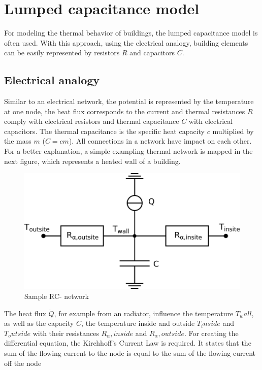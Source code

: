     
\section{Lumped capacitance model}
\label{section:modeling}
For modeling the thermal behavior of buildings, the lumped capacitance model is often used. With this approach, using the electrical analogy, building elements can be easily represented by resistors $R$ and capacitors $C$. \cite{Kramer.2012}

\subsection{Electrical analogy}
\label{electricalanalogy}

    Similar to an electrical network, the potential is represented by the temperature at one node, the heat flux corresponds to the current and thermal resistances $R$ comply with electrical resistors and thermal capacitance $C$ with electrical capacitors. The thermal capacitance is the specific heat capacity $c$ multiplied by the mass $m$ ($C=cm$). All connections in a network have impact on each other. For a better explanation, a simple exampling thermal network is mapped in the next figure, which represents a heated wall of a building.
    \begin{figure}[h]
    \centering
    \includegraphics{figure/beispiel Netzwerk.png}
    \caption{Sample RC- network}
    \label{fig:sampleRCnetwork}
    \end{figure}
    The heat flux $\dot{Q}$, for example from an radiator, influence the temperature $T_wall$, as well as the capacity $C$, the temperature inside and outside $T_inside$ and $T_outside$ with their resistances $R_\alpha,inside$ and $R_\alpha,outside$.
    For creating the differential equation, the Kirchhoff's Current Law is required. It states that the sum of the flowing current to the node is equal to the sum of the flowing current off the node 
